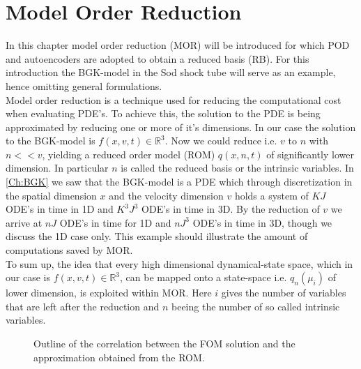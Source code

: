 
\chapter{Model Order Reduction}
\label{Ch:ROM}


In this chapter model order reduction (MOR) will be introduced for which POD and autoencoders are adopted to obtain a reduced basis (RB). For this introduction the BGK-model in the Sod shock tube will serve as an example, hence omitting general formulations.\\
Model order reduction is a technique used for reducing the computational cost when evaluating PDE's. To achieve this, the solution to the PDE is being approximated by reducing one or more of it's dimensions. In our case the solution to the BGK-model is \(f(x,v,t) \in \mathbb{R}^3\). Now we could reduce i.e. \(v\) to \(n\) with \(n << v\), yielding a reduced order model (ROM) \(q(x,n,t)\) of significantly lower dimension. In particular \(n\) is called the reduced basis or the intrinsic variables. In \cref{Ch:BGK} we saw that the BGK-model is a PDE which through discretization in the spatial dimension \(x\) and the velocity dimension \(v\) holds a system of \(KJ\) ODE's in time in 1D and \(K^3J^3\) ODE's in time in 3D.  By the reduction of \(v\) we arrive at \(nJ\) ODE's in time for 1D and \(nJ^3\) ODE's in time in 3D, though we discuss the 1D case only. This example should illustrate the amount of computations saved by MOR.\\
To sum up, the idea that every high dimensional dynamical-state space, which in our case is \(f(x,v,t) \in \mathbb{R}^3\), can be mapped onto a state-space i.e. \(q_n(\mu_i)\) of lower dimension, is exploited within MOR. Here \(i\) gives the number of variables that are left after the reduction and \(n\) beeing the number of so called intrinsic variables.\\
\begin{figure}[H]
	\begin{subfigure}{.45\textwidth}
		\centering
		
	\end{subfigure}\hfill
	\begin{subfigure}{.45\textwidth}
		\centering
		
	\end{subfigure}
	\caption{Outline of the correlation between the FOM solution and the approximation obtained from the ROM.}
\end{figure}
